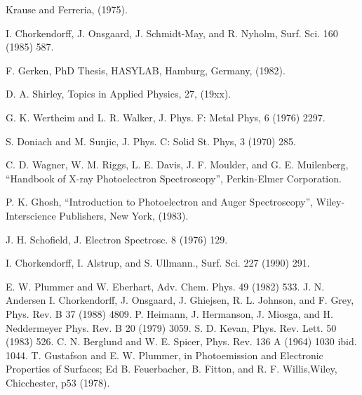 \documentclass[12pt]{book}
\begin{document}
\begin{thebibliography}{99}
              Krause and Ferreria, (1975).

            I.  Chorkendorff,  J.  Onsgaard,   J.
          Schmidt-May, and R. Nyholm, Surf. Sci. 160 (1985) 587.


           F. Gerken, PhD Thesis,  HASYLAB,  Hamburg,
          Germany, (1982).

           D. A. Shirley, Topics in Applied  Physics,
          27, (19xx).



              G. K. Wertheim and L.  R.  Walker,  J.
          Phys. F: Metal Phys, 6 (1976) 2297.



           S. Doniach and  M.  Sunjic,  J.  Phys.  C:
          Solid St. Phys, 3 (1970) 285.

           C. D. Wagner, W. M. Riggs, L. E. Davis,  J.
          F. Moulder,  and  G.  E.  Muilenberg,  ``Handbook  of  X-ray
          Photoelectron Spectroscopy'', Perkin-Elmer Corporation.

           P. K. Ghosh, ``Introduction to Photoelectron
          and Auger Spectroscopy'', Wiley-Interscience Publishers, New
          York, (1983).

           J. H. Schofield, J. Electron Spectrosc. 8
          (1976) 129.


              I. Chorkendorff, I. Alstrup,  and
          S. Ullmann., Surf. Sci. 227 (1990) 291.



 E. W. Plummer and W. Eberhart, Adv. Chem. Phys. 49 (1982) 533.
 J. N. Andersen I. Chorkendorff, J. Onsgaard, J. Ghiejsen, R. L. Johnson, and F. Grey, Phys. Rev. B 37 (1988) 4809.
 P. Heimann, J. Hermanson, J. Miosga, and H. Neddermeyer Phys. Rev. B 20 (1979) 3059.
 S. D. Kevan, Phys. Rev. Lett. 50 (1983) 526.
 C. N. Berglund and W. E. Spicer, Phys. Rev. 136 A (1964) 1030 ibid. 1044.
 T. Gustafson and E. W. Plummer, in Photoemission and Electronic Properties of Surfaces; Ed B. Feuerbacher, B. Fitton, and R. F. Willis,Wiley, Chicchester, p53 (1978).




\end{thebibliography}
\end{document}
